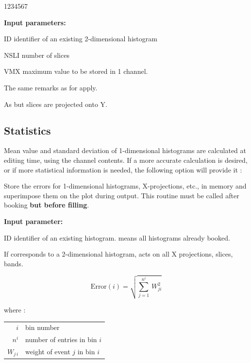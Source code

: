 \begin{DLttc}{1234567}
\item[{\rm\bf Input parameters:}]
\item[ID]   identifier of an existing 2-dimensional histogram
\item[NSLI] number of slices
\item[VMX]  maximum value to be stored in 1 channel.
\end{DLttc}
 
The same remarks as for  apply.
\medskip


\Action As  but slices are projected onto Y.

\subsection{Statistics}
\label{HSTATIS1}

Mean value and standard deviation of 1-dimensional histograms
are calculated at editing time, using the channel contents. 
If a more accurate calculation is desired, or if more 
statistical information is needed, the
following option will provide it :
\medskip


\Action Store the errors for 1-dimensional histograms, X-projections, 
etc., in memory and superimpose them on the plot during output.
This routine must be called after booking {\bf but before filling}.

\begin{DLttc}{12}
\item[{\rm\bf Input parameter:}]
\item[ID] identifier of an existing histogram.
           means all histograms already booked.
\end{DLttc}

If  corresponds to a 2-dimensional histogram,
 acts on all X projections, slices, bands.

\begin{minipage}{.49\textwidth}
\[\mbox{Error}(i) = \sqrt{\sum_{j=1}^{{n^{i}}}\, W_{{ji}}^{2}} \]
\end{minipage} \hfill
\begin{minipage}{.49\textwidth}
where :\qquad\begin{tabular}[t]{r@{\quad}l}
               $i$        & bin number                     \\
               $n^i$      & number of entries in bin $i$   \\
               $W_{j\,i}$ & weight of event $j$ in bin $i$ \\
              \end{tabular}
\end{minipage}

